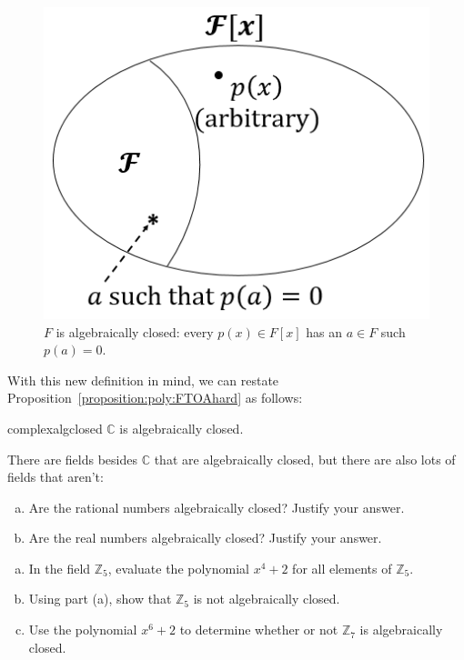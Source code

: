 \begin{figure}
\begin{center}
\includegraphics[scale=0.35]{images/algebraically_closed.png}
\caption{$F$ is algebraically closed: every $p(x)\in F[x]$ has an $a\in F$ such  $p(a)=0$.}\label{algebraicallyclosed}
\end{center}
\end{figure}

With this new definition in mind, we can restate Proposition~\ref{proposition:poly:FTOAhard} as follows: 

\begin{prop}{complexalgclosed}
$\mathbb{C}$ is algebraically closed.
\end{prop}

There are fields  besides $\mathbb{C}$ that are algebraically closed,  but there are  also  lots of fields that aren't:

\begin{exercise}{}
\begin {enumerate}[(a)]
\item
Are the rational numbers algebraically closed? Justify your answer.
\item
Are the real numbers algebraically closed? Justify your answer.
\end{enumerate}
\end{exercise}

\begin{exercise}{}
\begin{enumerate}[(a)]
\item
In the field $\mathbb{Z}_5$, evaluate the polynomial $x^4+2$  for all elements of  $\mathbb{Z}_5$.
\item
Using part (a), show  that $\mathbb{Z}_5$ is not algebraically closed.
\item
Use the polynomial $x^6 + 2$ to determine whether or not $\mathbb{Z}_7$ is algebraically closed.
\end{enumerate}
\end{exercise}

